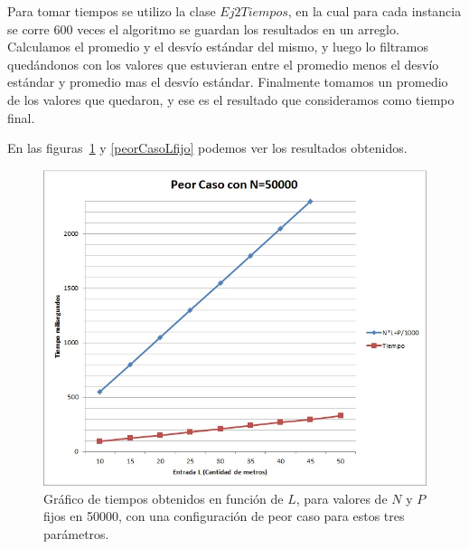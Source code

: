 Para tomar tiempos se utilizo la clase $ Ej2Tiempos $, en la cual para cada instancia se corre 600 veces el algoritmo se guardan los resultados en un arreglo. Calculamos el promedio  y el desvío estándar del mismo, y luego lo filtramos quedándonos con los valores que estuvieran entre el promedio menos el desvío estándar y promedio mas el desvío estándar. Finalmente tomamos un promedio de los valores que quedaron, y ese es el resultado que consideramos como tiempo final.

En las figuras~\ref{peorCasoNfijo} y \ref{peorCasoLfijo} podemos ver los resultados obtenidos.

\begin{figure}[H]
\centering
\includegraphics[scale=0.6]{../PeorCasoEj2Nfijo.jpg}
\caption{Gráfico de tiempos obtenidos en función de $L$, para valores de $ N $ y $ P $ fijos en 50000, con una configuración de peor caso para estos tres parámetros.}
\label{peorCasoNfijo}
\end{figure}

